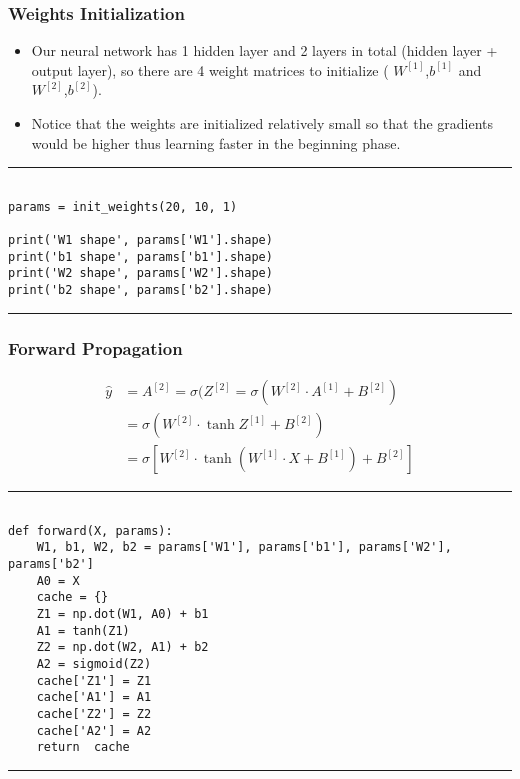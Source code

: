\documentclass[11pt]{beamer}
\begin{document}
\begin{frame}[fragile]
\frametitle{Weights Initialization}
\begin{itemize}
\item Our neural network has 1 hidden layer and 2 layers in total (hidden layer + output layer), so there are 4 weight matrices to initialize ( $W^{[1]}$,$b^{[1]}$  and  $W^{[2]}$,$b^{[2]}$). 
\item Notice that the weights are initialized relatively small so that the gradients would be higher thus learning faster in the beginning phase.
\end{itemize}
\rule{\textwidth}{1pt}
\scriptsize
\begin{verbatim}

params = init_weights(20, 10, 1)

print('W1 shape', params['W1'].shape)
print('b1 shape', params['b1'].shape)
print('W2 shape', params['W2'].shape)
print('b2 shape', params['b2'].shape)

\end{verbatim}
\rule{\textwidth}{1pt}
\end{frame}
\begin{frame}[fragile]
\frametitle{Forward Propagation}
\scriptsize

\begin{align*}
\hat y &= A^{[2]} = \sigma(Z^{[2]} = \sigma \left( W^{[2]} \cdot A^{[1]} + B^{[2]} \right) \\
&= \sigma \left( W^{[2]} \cdot \tanh{Z^{[1]}} + B^{[2]} \right) \\
&= \sigma \left[ W^{[2]} \cdot \tanh\left( W^{[1]} \cdot X + B^{[1]} \right) + B^{[2]} \right]
\end{align*}

\rule{\textwidth}{1pt}
\begin{verbatim}

def forward(X, params):
    W1, b1, W2, b2 = params['W1'], params['b1'], params['W2'], params['b2']
    A0 = X
    cache = {}
    Z1 = np.dot(W1, A0) + b1
    A1 = tanh(Z1)
    Z2 = np.dot(W2, A1) + b2
    A2 = sigmoid(Z2)
    cache['Z1'] = Z1
    cache['A1'] = A1
    cache['Z2'] = Z2
    cache['A2'] = A2
    return  cache

\end{verbatim}
\rule{\textwidth}{1pt}
\end{frame}
\end{document}
